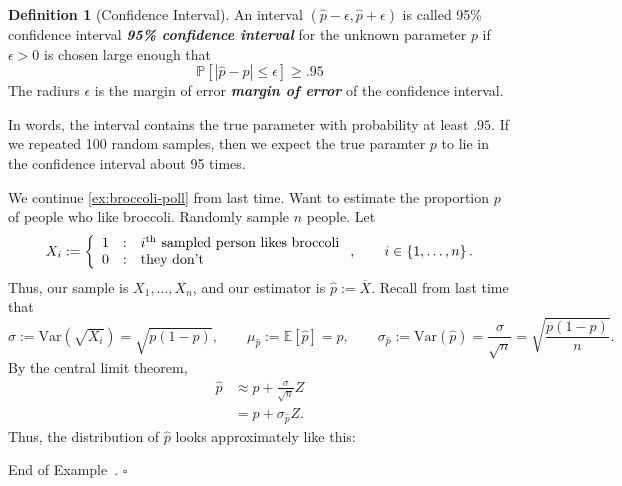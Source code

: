 \documentclass[10pt]{article}
\theoremstyle{definition}
\newtheorem{definition}[theorem]{Definition}
\newtheorem{example}[theorem]{Example}
\renewenvironment{example}
{\begin{oldexample}}
  {\par\smallskip\hfill   End of Example~\theexample. $\square$    \par\end{oldexample}}
\newcommand{\1}[1]{\textbf{1}_{\left[#1\right]}} %
\def\E{\mathbb{E}} %
\def\P{\mathbb{P}} %
\def\Var{\mathrm{Var}} %
\DeclareRobustCommand{\demph}[1]{%
  \ifmmode
  {\color{Blue}#1}%
  \else
  {\color{Blue}\bfseries\slshape #1}%
  \fi
}
\begin{document}
\begin{definition}[Confidence Interval]
  An interval $(\widehat{p}-\epsilon,\widehat{p}+\epsilon)$ is called
  \demph{95\% confidence interval} for the unknown parameter $p$ if
  $\epsilon>0$ is chosen large enough that
  \begin{equation}\label{eq:19}
    \P\left[\left| \widehat{p}-p \right| \leq \epsilon\right] \geq .95
  \end{equation}
  The radiurs $\epsilon$ is the \demph{margin of error} of the confidence
  interval.
\end{definition}
In words, the interval contains the true parameter with probability at least
$.95$. If we repeated 100 random samples, then we expect the true paramter $p$
to lie in the confidence interval about 95 times.


\begin{example}[Broccoli Poll]
  \label{ex:broccoli-poll}
  We continue \cref{ex:broccoli-poll} from last time. Want to estimate the
  proportion $p$ of people who like broccoli. Randomly sample $n$ people. Let
  \begin{equation*}
    X_{i}  :=\left\{ \begin{array}{l@{\quad:\quad}l} 1 & \text{$i^{\rm th}$ sampled person
          likes broccoli}\\ 0 &\text{they don't} \end{array}\right., \qquad i\in \left\{1,\ldots,n\right\}. 
  \end{equation*}
  Thus, our sample is $X_{1},\ldots,X_{n}$, and our estimator is
  $\widehat{p} := \overline{X}$. Recall from last time that
  \begin{equation*}
    \sigma :=\Var( \sqrt{X_{i}})= \sqrt{p(1-p)}, \qquad \mu_{\widehat{p}} := \E[\widehat{p}] = p, \qquad \sigma_{\widehat{p}}:= \Var(\widehat{p}) = \frac{\sigma}{\sqrt{n}} = \sqrt{\frac{p(1-p)}{n}}.
  \end{equation*}
  By the central limit theorem,
  \begin{align*}
    \widehat{p} 
    &\approx p + \frac{\sigma}{\sqrt{n}}Z \\
    &= p + \sigma_{\widehat{p}}Z.
  \end{align*}
  Thus, the distribution of $\widehat{p}$ looks approximately like this:
  


\end{example}
\end{document}
